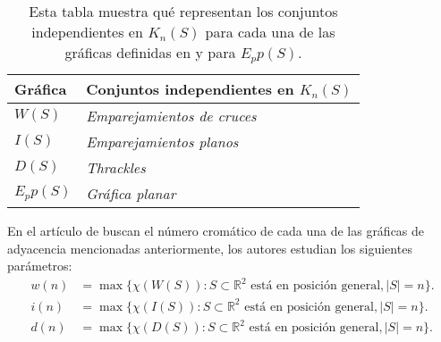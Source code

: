 %
\begin{table}
  \centering
  \begin{tabular}{|l|l|}
    \hline
    Gráfica   & Conjuntos independientes en $K_n(S)$    \\ \hline \hline
    $W(S)$    & \emph{Emparejamientos de cruces}        \\ \hline
    $I(S)$    & \emph{Emparejamientos planos}           \\ \hline
    $D(S)$    & \emph{Thrackles}                        \\ \hline
    $E_pp(S)$ & \emph{Gráfica planar}                   \\ \hline
  \end{tabular}
  \caption{Esta tabla muestra qué representan los conjuntos independientes en $K_n(S)$
  para cada una de las gráficas definidas en \cite{Araujo2005} y para $E_pp(S)$.}
  \label{table:graficasincidencia}
\end{table}
En el artículo de \cite{Araujo2005} buscan el número cromático de cada una de las
gráficas de adyacencia mencionadas anteriormente, los autores estudian los siguientes parámetros:
  \begin{align*}
    w(n) &= \max\{\chi(W(S)): S\subset \mathbb{R}^2 \text{ está en posición general}, |S|=n\}. \\
    i(n) &= \max\{\chi(I(S)): S\subset \mathbb{R}^2 \text{ está en posición general}, |S|=n\}. \\
    d(n) &= \max\{\chi(D(S)): S\subset \mathbb{R}^2 \text{ está en posición general}, |S|=n\}. \\
  \end{align*}
